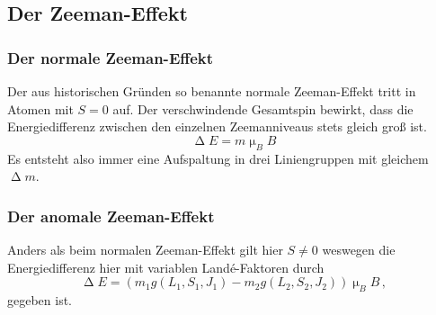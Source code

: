 \subsection{Der Zeeman-Effekt}
\subsubsection{Der normale Zeeman-Effekt}
Der aus historischen Gründen so benannte normale Zeeman-Effekt tritt in Atomen mit $S=0$ auf. Der verschwindende Gesamtspin bewirkt, dass die Energiedifferenz zwischen den einzelnen Zeemanniveaus stets gleich groß ist.
\begin{equation}
  \upDelta E=m\upmu_B B
\end{equation}
Es entsteht also immer eine Aufspaltung in drei Liniengruppen mit gleichem $\upDelta m$.
\subsubsection{Der anomale Zeeman-Effekt}
Anders als beim normalen Zeeman-Effekt gilt hier $S\neq 0$ weswegen die Energiedifferenz hier mit variablen Landé-Faktoren durch
\begin{equation}
\upDelta E = \left(m_1 g(L_1,S_1,J_1)-m_2g(L_2,S_2,J_2)\right)\upmu_B B\,,
\end{equation}
gegeben ist.
